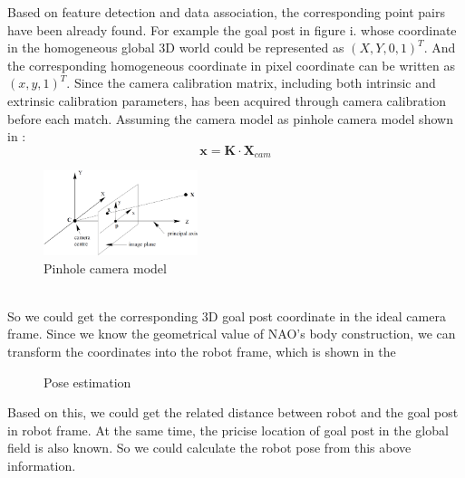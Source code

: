 Based on feature detection and data association, the corresponding point pairs have been already found. For example the goal post in figure i. whose coordinate in the homogeneous global 3D world could be represented as $(X,Y,0,1)^T$. And the corresponding homogeneous coordinate in pixel coordinate can be written as $(x,y,1)^T$. Since the camera calibration matrix, including both intrinsic and extrinsic calibration parameters, has been acquired through camera calibration before each match. Assuming the camera model as pinhole camera model shown in  \cite{hartley2003multiple}: 
\[ %
\mathbf{x} = \mathbf{K} \cdot \mathbf{X}_{cam}
\]
\begin{figure}[!htb]
    \includegraphics[width=0.4\textwidth]{pics/cameramodel.png}
    \centering
    \caption{Pinhole camera model}
    \label{fig: camera}
\end{figure}\\

So we could get the corresponding 3D goal post coordinate in the ideal camera frame. Since we know the geometrical value of NAO's body construction, we can transform the coordinates into the robot frame, which is shown in the 
\begin{figure}[tbp]
\centering
{}
\caption{Pose estimation}
\label{fig: trans}
\end{figure}
Based on this, we could get the related distance between robot and the goal post in robot frame. At the same time, the pricise location of goal post in the global field is also known. So we could calculate the robot pose from this above information. %
